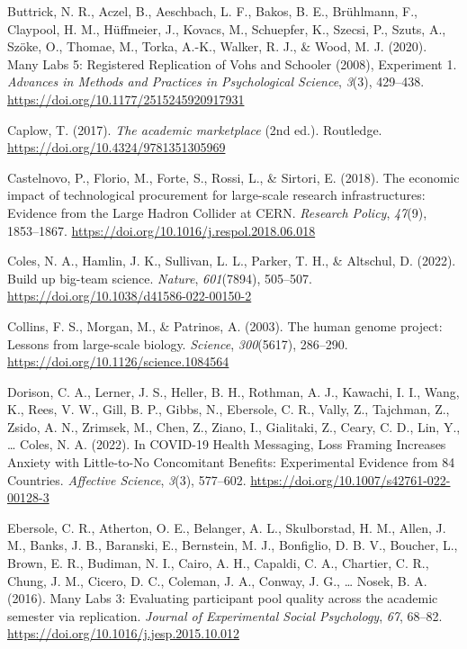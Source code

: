 \documentclass[
  man,mask,floatsintext]{apa7}
\newlength{\cslhangindent}
\newlength{\cslentryspacingunit} %
\newenvironment{CSLReferences}[2] %
 {%
  \setlength{\parindent}{0pt}
  \ifodd #1
  \let\oldpar\par
  \def\par{\hangindent=\cslhangindent\oldpar}
  \fi
  \setlength{\parskip}{#2\cslentryspacingunit}
 }%
 {}
\begin{document}
\begin{CSLReferences}{1}{0}
\leavevmode{}%
Buttrick, N. R., Aczel, B., Aeschbach, L. F., Bakos, B. E., Brühlmann, F., Claypool, H. M., Hüffmeier, J., Kovacs, M., Schuepfer, K., Szecsi, P., Szuts, A., Szöke, O., Thomae, M., Torka, A.-K., Walker, R. J., \& Wood, M. J. (2020). Many Labs 5: Registered Replication of Vohs and Schooler (2008), Experiment 1. \emph{Advances in Methods and Practices in Psychological Science}, \emph{3}(3), 429--438. \url{https://doi.org/10.1177/2515245920917931}

\leavevmode{}%
Caplow, T. (2017). \emph{The academic marketplace} (2nd ed.). Routledge. \url{https://doi.org/10.4324/9781351305969}

\leavevmode{}%
Castelnovo, P., Florio, M., Forte, S., Rossi, L., \& Sirtori, E. (2018). The economic impact of technological procurement for large-scale research infrastructures: Evidence from the Large Hadron Collider at CERN. \emph{Research Policy}, \emph{47}(9), 1853--1867. \url{https://doi.org/10.1016/j.respol.2018.06.018}

\leavevmode{}%
Coles, N. A., Hamlin, J. K., Sullivan, L. L., Parker, T. H., \& Altschul, D. (2022). Build up big-team science. \emph{Nature}, \emph{601}(7894), 505--507. \url{https://doi.org/10.1038/d41586-022-00150-2}

\leavevmode{}%
Collins, F. S., Morgan, M., \& Patrinos, A. (2003). The human genome project: Lessons from large-scale biology. \emph{Science}, \emph{300}(5617), 286--290. \url{https://doi.org/10.1126/science.1084564}

\leavevmode{}%
Dorison, C. A., Lerner, J. S., Heller, B. H., Rothman, A. J., Kawachi, I. I., Wang, K., Rees, V. W., Gill, B. P., Gibbs, N., Ebersole, C. R., Vally, Z., Tajchman, Z., Zsido, A. N., Zrimsek, M., Chen, Z., Ziano, I., Gialitaki, Z., Ceary, C. D., Lin, Y., \ldots{} Coles, N. A. (2022). In {COVID}-19 {Health} {Messaging}, {Loss} {Framing} {Increases} {Anxiety} with {Little}-to-{No} {Concomitant} {Benefits}: {Experimental} {Evidence} from 84 {Countries}. \emph{Affective Science}, \emph{3}(3), 577--602. \url{https://doi.org/10.1007/s42761-022-00128-3}

\leavevmode{}%
Ebersole, C. R., Atherton, O. E., Belanger, A. L., Skulborstad, H. M., Allen, J. M., Banks, J. B., Baranski, E., Bernstein, M. J., Bonfiglio, D. B. V., Boucher, L., Brown, E. R., Budiman, N. I., Cairo, A. H., Capaldi, C. A., Chartier, C. R., Chung, J. M., Cicero, D. C., Coleman, J. A., Conway, J. G., \ldots{} Nosek, B. A. (2016). Many Labs 3: Evaluating participant pool quality across the academic semester via replication. \emph{Journal of Experimental Social Psychology}, \emph{67}, 68--82. \url{https://doi.org/10.1016/j.jesp.2015.10.012}


\end{CSLReferences}
\end{document}
